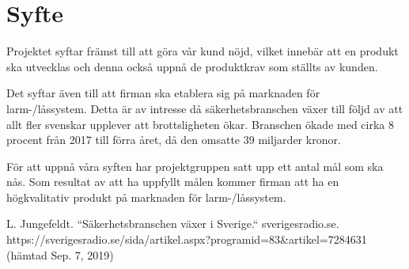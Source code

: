 \documentclass[a4paper]{article}
\begin{document}
\section{Syfte}

Projektet syftar främst till att göra vår kund nöjd, vilket innebär att en produkt ska utvecklas och denna också uppnå de produktkrav som ställts av kunden.

Det syftar även till att firman ska etablera sig på marknaden för \\larm-/låssystem. Detta är av intresse då säkerhetsbranschen växer till följd av att allt fler svenskar upplever att brottsligheten ökar. Branschen ökade med cirka 8 procent från 2017 till förra året, då den omsatte 39 miljarder kronor\cite{sverigesRadio}.

För att uppnå våra syften har projektgruppen satt upp ett antal mål som ska nås. Som resultat av att ha uppfyllt målen kommer firman att ha en högkvalitativ produkt på marknaden för larm-/låssystem.

\begin{thebibliography}{999}
L. Jungefeldt. ``Säkerhetsbranschen växer i Sverige.`` sverigesradio.se.
https://sverigesradio.se/sida/artikel.aspx?programid=83\&artikel=7284631 (hämtad Sep. 7, 2019)
\end{thebibliography}
\end{document}
